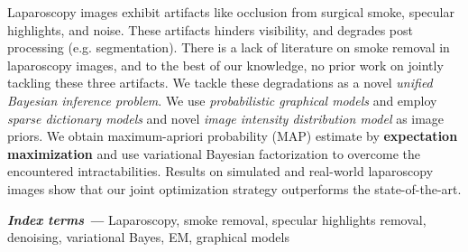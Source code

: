 \begin{Abstract}
Laparoscopy images exhibit artifacts like occlusion from surgical smoke, specular highlights, and noise. These artifacts hinders visibility, and degrades post processing (e.g. segmentation). There is a lack of literature on smoke removal in laparoscopy images, and to the best of our knowledge, no prior work on jointly tackling these three artifacts. We tackle these degradations as a novel \textit{unified Bayesian inference problem}. We use \textit{probabilistic graphical models} and employ \textit{sparse dictionary models} and novel \textit{image intensity distribution model} as image priors. We obtain maximum-apriori probability (MAP) estimate by \textbf{expectation maximization} and use variational Bayesian factorization to overcome the encountered intractabilities. Results on simulated and real-world laparoscopy images show that our joint optimization strategy outperforms the state-of-the-art.

\textbf{\textit{Index terms ---}} Laparoscopy, smoke removal, specular highlights removal, denoising, variational Bayes, EM, graphical models
%
%
%
%
%
\end{Abstract}

